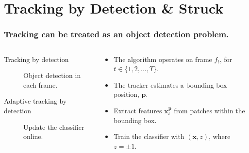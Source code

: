 \section{Tracking by Detection \& Struck}

\begin{frame}
    \frametitle{Tracking can be treated as an object detection problem.}
    \begin{columns}[T]
        \begin{column}{0.5\textwidth}
            \begin{description}
                \item [Tracking by detection] Object detection in each frame.
                \item [Adaptive tracking by detection] Update the classifier online.
            \end{description}
        \end{column}
        \begin{column}{0.5\textwidth}
            \begin{itemize}
                \item The algorithm operates on frame \(f_t\), for \(t \in \{1, 2, ..., T\}\).
                \item The tracker estimates a bounding box position, \(\mathbf{p}\).
                \item Extract features \(\mathbf{x}_t^\mathbf{p}\) from patches within the bounding box.
                \item Train the classifier with \((\mathbf{x}, z)\), where \(z = \pm1\).
            \end{itemize}
        \end{column}
    \end{columns}
\end{frame}

